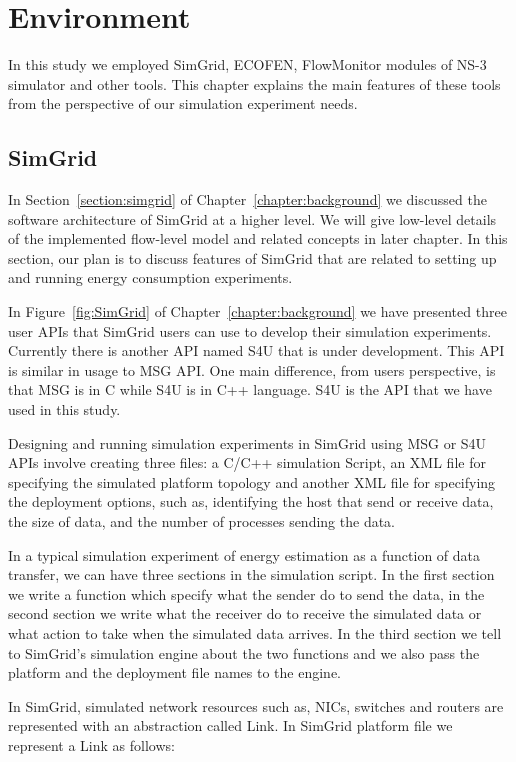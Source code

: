\chapter{Environment}
\label{chapter:environment}
In this study we employed SimGrid, ECOFEN, FlowMonitor modules of NS-3 simulator and other tools. This chapter explains the main features of these tools from the perspective of our simulation experiment needs.

\section{SimGrid}
\label{section:simgridenvironment}
In Section~\ref{section:simgrid} of Chapter~\ref{chapter:background} we discussed the software architecture of SimGrid at a higher level. We will give low-level details of the implemented flow-level model and related concepts in later chapter. In this section, our plan is to discuss features of SimGrid that are related to setting up and running energy consumption experiments.

In Figure~\ref{fig:SimGrid} of Chapter~\ref{chapter:background} we have presented three user APIs that SimGrid users can use to develop their simulation experiments. Currently there is another API named S4U that is under development. This API is similar in usage to MSG API. One main difference, from users perspective, is that MSG is in C while S4U is in C++ language. S4U is the API that we have used in this study.  
  
Designing and running simulation experiments in SimGrid using MSG or S4U APIs involve creating three files: a C/C++ simulation Script, an XML file for specifying the simulated platform topology and another XML file for specifying the deployment options, such as, identifying the host that send or receive data, the size of data, and the number of processes sending the data. 

In a typical simulation experiment of energy estimation as a function of data transfer, we can have three sections in the simulation script. In the first section we write a function which specify what the sender do to send the data, in the second section we write what the receiver do to receive the simulated data or what action to take when the simulated data arrives. In the third section we tell to SimGrid's simulation engine about the two functions and we also pass the platform and the deployment file names to the engine. 

In SimGrid, simulated network resources such as, NICs, switches and routers are represented with an abstraction called Link. In SimGrid platform file we represent a Link as follows:

